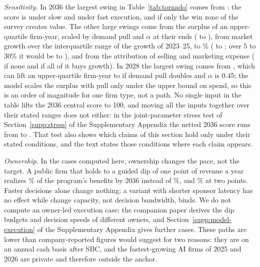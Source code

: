 \emph{Sensitivity.} In 2036 the largest swing in Table~\ref{tab:tornado} comes from \TornFirstSix: the score is \TornPaceSixLo{} under slow and \TornPaceSixHi{} under fast execution, and \TornBcgWinSixLo{} if only the win zone of the survey creates value. The other large swings come from the surplus of an upper-quartile firm-year, scaled by demand pull and $\alpha$ at their ends (\TornSurplusSixLo{} to \TornSurplusSixHi), from market growth over the interquartile range of the growth of 2023--25, \GBandLo{} to \GBandHi\% (\TornGSixLo{} to \TornGSixHi; over 5 to 30\% it would be \TornGOldSixLo{} to \TornGOldSixHi), and from the attribution of selling and marketing expense (\TornAttributionSixLo{} if none and \TornAttributionSixHi{} if all of it buys growth). In 2028 the largest swing comes from \TornFirstEight, which can lift an upper-quartile firm-year to \TornSurplusEightHi{} if demand pull doubles and $\alpha$ is 0.45; the model scales the surplus with pull only under the upper bound on spend, so this is an order of magnitude for one firm type, not a path. No single input in the table lifts the 2036 central score to 100, and moving all the inputs together over their stated ranges does not either: in the joint-parameter stress test of Section~\ref{supp:stress} of the Supplementary Appendix the netted 2036 score runs from \StNetSixMin{} to \StNetSixMax. That test also shows which claims of this section hold only under their stated conditions, and the text states those conditions where each claim appears.

\emph{Ownership.} In the cases computed here, ownership changes the pace, not the target. A public firm that holds to a guided dip of one point of revenue a year realizes \VarDipOneShare\% of the program's benefits by 2036 instead of \PaceCenSix\%, and \VarDipTwoShare\% at two points. Faster decisions alone change nothing: a variant with shorter sponsor latency has no effect while change capacity, not decision bandwidth, binds. We do not compute an owner-led execution case; the companion paper \citep{murthy2026transformation} derives the dip budgets and decision speeds of different owners, and Section~\ref{supp:model-execution} of the Supplementary Appendix gives further cases. These paths are lower than company-reported figures would suggest for two reasons: they are on an annual cash basis after SBC, and the fastest-growing AI firms of 2025 and 2026 are private and therefore outside the anchor.


